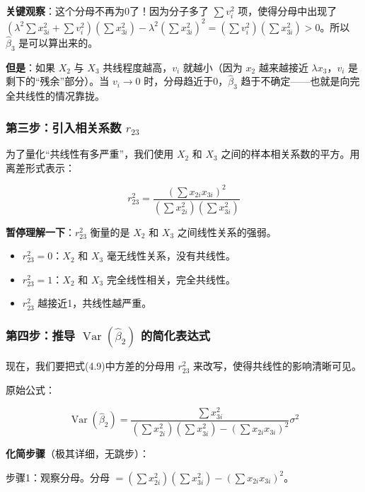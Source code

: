 \documentclass[12pt,a4paper]{ctexart}
\newcommand{\Var}{\operatorname{Var}}
\begin{document}
\textbf{关键观察}：这个分母不再为0了！因为分子多了 $\sum v_i^2$ 项，使得分母中出现了 $(\lambda^2 \sum x_{3i}^2 + \sum v_i^2)(\sum x_{3i}^2) - \lambda^2 (\sum x_{3i}^2)^2 = (\sum v_i^2)(\sum x_{3i}^2) > 0$。所以 $\hat{\beta}_3$ 是可以算出来的。

\textbf{但是}：如果 $X_2$ 与 $X_3$ 共线程度越高，$v_i$ 就越小（因为 $x_2$ 越来越接近 $\lambda x_3$，$v_i$ 是剩下的“残余”部分）。当 $v_i \to 0$ 时，分母趋近于0，$\hat{\beta}_3$ 趋于不确定——也就是向完全共线性的情况靠拢。

\subsubsection{第三步：引入相关系数 $r_{23}$}

为了量化“共线性有多严重”，我们使用 $X_2$ 和 $X_3$ 之间的样本相关系数的平方。用离差形式表示：

\begin{equation}
r_{23}^2 = \frac{(\sum x_{2i} x_{3i})^2}{(\sum x_{2i}^2)(\sum x_{3i}^2)} \tag{4.13}
\end{equation}

\textbf{暂停理解一下}：$r_{23}^2$ 衡量的是 $X_2$ 和 $X_3$ 之间线性关系的强弱。
\begin{itemize}
    \item $r_{23}^2 = 0$：$X_2$ 和 $X_3$ 毫无线性关系，没有共线性。
    \item $r_{23}^2 = 1$：$X_2$ 和 $X_3$ 完全线性相关，完全共线性。
    \item $r_{23}^2$ 越接近1，共线性越严重。
\end{itemize}

\subsubsection{第四步：推导 $\Var(\hat{\beta}_2)$ 的简化表达式}

现在，我们要把式(4.9)中方差的分母用 $r_{23}^2$ 来改写，使得共线性的影响清晰可见。

原始公式：

\begin{equation}
\Var(\hat{\beta}_2) = \frac{\sum x_{3i}^2}{(\sum x_{2i}^2)(\sum x_{3i}^2) - (\sum x_{2i} x_{3i})^2} \sigma^2 \tag{4.9}
\end{equation}

\textbf{化简步骤}（极其详细，无跳步）：

步骤1：观察分母。分母 $= (\sum x_{2i}^2)(\sum x_{3i}^2) - (\sum x_{2i} x_{3i})^2$。
\end{document}
